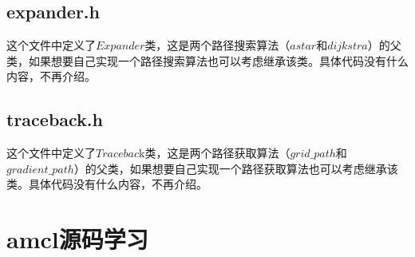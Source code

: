 \documentclass[9pt, oneside]{book}
\begin{document}
\subsection{expander.h}

这个文件中定义了$Expander$类，这是两个路径搜索算法（$astar$和$dijkstra$）的父类，如果想要自己实现一个路径搜索算法也可以考虑继承该类。具体代码没有什么内容，不再介绍。

\subsection{traceback.h}

这个文件中定义了$Tracebac$k类，这是两个路径获取算法（$grid\_path$和$gradient\_path$）的父类，如果想要自己实现一个路径获取算法也可以考虑继承该类。具体代码没有什么内容，不再介绍。














\section{amcl源码学习}
\end{document}
